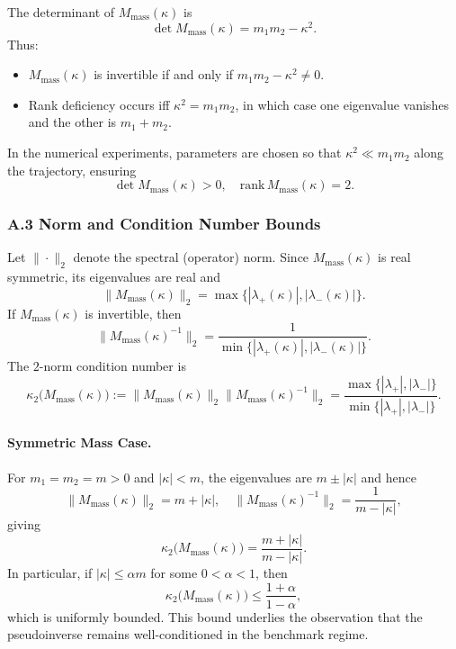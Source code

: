 \documentclass[11pt]{article}
\begin{document}
The determinant of $M_{\text{mass}}(\kappa)$ is
\begin{equation}
  \det M_{\text{mass}}(\kappa)
  = m_1 m_2 - \kappa^2.
\end{equation}
Thus:
\begin{itemize}
  \item $M_{\text{mass}}(\kappa)$ is invertible if and only if $m_1 m_2 - \kappa^2 \neq 0$.
  \item Rank deficiency occurs iff $\kappa^2 = m_1 m_2$, in which case one eigenvalue vanishes and the other is $m_1 + m_2$.
\end{itemize}

In the numerical experiments, parameters are chosen so that $\kappa^2 \ll m_1 m_2$ along the trajectory, ensuring
\[
  \det M_{\text{mass}}(\kappa) > 0, \quad \text{rank}\,M_{\text{mass}}(\kappa) = 2.
\]

\subsubsection*{A.3 Norm and Condition Number Bounds}

Let $\|\cdot\|_2$ denote the spectral (operator) norm. Since $M_{\text{mass}}(\kappa)$ is real symmetric, its eigenvalues are real and
\[
  \|M_{\text{mass}}(\kappa)\|_2 = \max\{|\lambda_+(\kappa)|, |\lambda_-(\kappa)|\}.
\]
If $M_{\text{mass}}(\kappa)$ is invertible, then
\[
  \|M_{\text{mass}}(\kappa)^{-1}\|_2
  = \frac{1}{\min\{|\lambda_+(\kappa)|, |\lambda_-(\kappa)|\}}.
\]
The $2$-norm condition number is
\[
  \kappa_2\big(M_{\text{mass}}(\kappa)\big)
  := \|M_{\text{mass}}(\kappa)\|_2
     \|M_{\text{mass}}(\kappa)^{-1}\|_2
  = \frac{\max\{|\lambda_+|,|\lambda_-|\}}
         {\min\{|\lambda_+|,|\lambda_-|\}}.
\]

\paragraph{Symmetric Mass Case.} For $m_1=m_2=m>0$ and $|\kappa|<m$, the eigenvalues are $m\pm|\kappa|$ and hence
\[
  \|M_{\text{mass}}(\kappa)\|_2 = m + |\kappa|,
  \quad
  \|M_{\text{mass}}(\kappa)^{-1}\|_2 = \frac{1}{m - |\kappa|},
\]
giving
\begin{equation}
  \kappa_2\big(M_{\text{mass}}(\kappa)\big)
  = \frac{m + |\kappa|}{m - |\kappa|}.
\end{equation}
In particular, if $|\kappa|\le \alpha m$ for some $0<\alpha<1$, then
\begin{equation}
  \kappa_2\big(M_{\text{mass}}(\kappa)\big)
  \le \frac{1+\alpha}{1-\alpha},
\end{equation}
which is uniformly bounded. This bound underlies the observation that the pseudoinverse remains well-conditioned in the benchmark regime.
\end{document}
